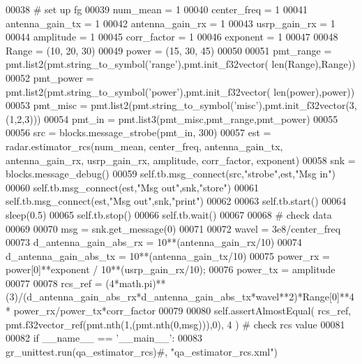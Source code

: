 \begin{DoxyCode}
00038         \textcolor{comment}{# set up fg}
00039         num\_mean = 1
00040         center\_freq = 1
00041         antenna\_gain\_tx = 1
00042         antenna\_gain\_rx = 1
00043         usrp\_gain\_rx = 1
00044         amplitude = 1
00045         corr\_factor = 1
00046         exponent = 1
00047 
00048         Range = (10, 20, 30)
00049         power = (15, 30, 45)
00050 
00051         pmt\_range = pmt.list2(pmt.string\_to\_symbol(\textcolor{stringliteral}{'range'}),pmt.init\_f32vector(
      len(Range),Range))
00052         pmt\_power = pmt.list2(pmt.string\_to\_symbol(\textcolor{stringliteral}{'power'}),pmt.init\_f32vector(
      len(power),power))
00053         pmt\_misc = pmt.list2(pmt.string\_to\_symbol(\textcolor{stringliteral}{'misc'}),pmt.init\_f32vector(3,(1,2,3)))
00054         pmt\_in = pmt.list3(pmt\_misc,pmt\_range,pmt\_power)
00055 
00056         src = blocks.message\_strobe(pmt\_in, 300)
00057         est = radar.estimator\_rcs(num\_mean, center\_freq, antenna\_gain\_tx, antenna\_gain\_rx, usrp\_gain\_rx, 
      amplitude, corr\_factor, exponent)
00058         snk = blocks.message\_debug()
00059         self.tb.msg\_connect(src,\textcolor{stringliteral}{"strobe"},est,\textcolor{stringliteral}{"Msg in"})
00060         self.tb.msg\_connect(est,\textcolor{stringliteral}{"Msg out"},snk,\textcolor{stringliteral}{"store"})
00061         self.tb.msg\_connect(est,\textcolor{stringliteral}{"Msg out"},snk,\textcolor{stringliteral}{"print"})
00062         
00063         self.tb.start()
00064         sleep(0.5)
00065         self.tb.stop()
00066         self.tb.wait()
00067 
00068         \textcolor{comment}{# check data}
00069 
00070         msg = snk.get\_message(0)
00071 
00072         wavel = 3e8/center\_freq
00073         d\_antenna\_gain\_abs\_rx = 10**(antenna\_gain\_rx/10)
00074         d\_antenna\_gain\_abs\_tx = 10**(antenna\_gain\_tx/10)
00075         power\_rx = power[0]**exponent / 10**(usrp\_gain\_rx/10);
00076         power\_tx = amplitude
00077 
00078         rcs\_ref = (4*math.pi)**(3)/(d\_antenna\_gain\_abs\_rx*d\_antenna\_gain\_abs\_tx*wavel**2)*Range[0]**4*
      power\_rx/power\_tx*corr\_factor
00079 
00080         self.assertAlmostEqual( rcs\_ref, pmt.f32vector\_ref(pmt.nth(1,(pmt.nth(0,msg))),0), 4 ) \textcolor{comment}{# check rcs
       value}
00081 
00082 \textcolor{keywordflow}{if} \_\_name\_\_ == \textcolor{stringliteral}{'\_\_main\_\_'}:
00083     gr\_unittest.run(qa\_estimator\_rcs)\textcolor{comment}{#, "qa\_estimator\_rcs.xml")}
\end{DoxyCode}

